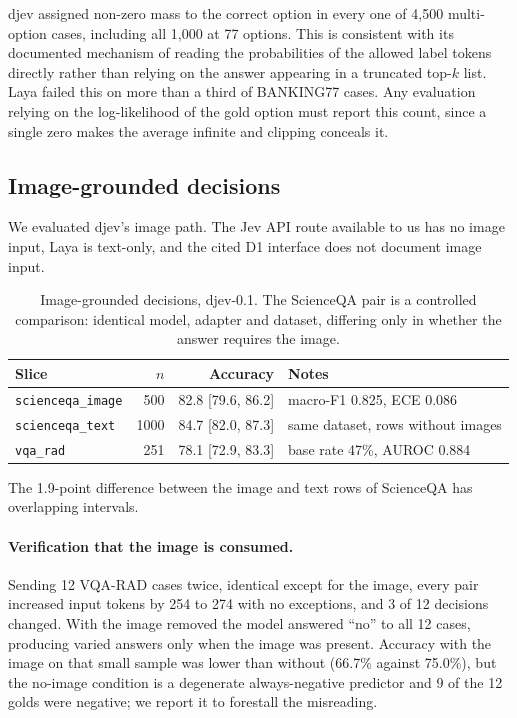 djev assigned non-zero mass to the correct option in every one of 4{,}500 multi-option cases, including all 1{,}000 at 77 options. This is consistent with its documented mechanism of reading the probabilities of the allowed label tokens directly rather than relying on the answer appearing in a truncated top-$k$ list. Laya failed this on more than a third of BANKING77 cases. Any evaluation relying on the log-likelihood of the gold option must report this count, since a single zero makes the average infinite and clipping conceals it.

\subsection{Image-grounded decisions}
\label{sec:images}

We evaluated djev's image path. The Jev API route available to us has no image input, Laya is text-only, and the cited D1 interface does not document image input.

\begin{table}[t]
\centering
\caption{Image-grounded decisions, djev-0.1. The ScienceQA pair is a controlled comparison: identical model, adapter and dataset, differing only in whether the answer requires the image.}
\label{tab:images}
\small
\begin{tabular}{lrrl}
\toprule
Slice & $n$ & Accuracy & Notes \\
\midrule
\texttt{scienceqa\_image} & 500  & 82.8 \small{[79.6, 86.2]} & macro-F1 0.825, ECE 0.086 \\
\texttt{scienceqa\_text}  & 1000 & 84.7 \small{[82.0, 87.3]} & same dataset, rows without images \\
\texttt{vqa\_rad}         & 251  & 78.1 \small{[72.9, 83.3]} & base rate 47\%, AUROC 0.884 \\
\bottomrule
\end{tabular}
\end{table}

The 1.9-point difference between the image and text rows of ScienceQA has overlapping intervals.

\paragraph{Verification that the image is consumed.} Sending 12 VQA-RAD cases twice, identical except for the image, every pair increased input tokens by 254 to 274 with no exceptions, and 3 of 12 decisions changed. With the image removed the model answered ``no'' to all 12 cases, producing varied answers only when the image was present. Accuracy with the image on that small sample was lower than without (66.7\% against 75.0\%), but the no-image condition is a degenerate always-negative predictor and 9 of the 12 golds were negative; we report it to forestall the misreading.

